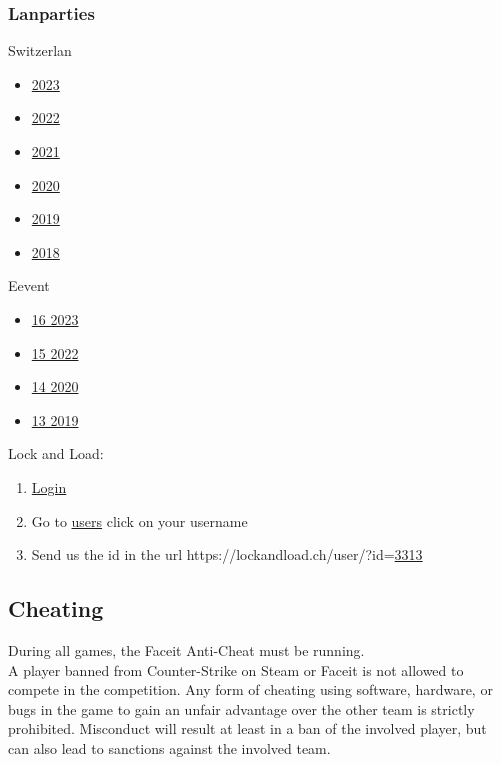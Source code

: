\documentclass{article}
\begin{document}
\subsubsection{Lanparties}
Switzerlan
\begin{itemize}
    \item \href{https://battlefy.com/switzerlan-2023/switzerlan-2023-counter-strike-2/65293e1a490b280d6f6adcb0/participants}{2023}
    \item \href{https://battlefy.com/switzerlan-2022/switzerlan-2022-csgo/634937c11ecc2379690e86f8/participants}{2022}
    \item \href{https://battlefy.com/switzerlan-2021/switzerlan-2021-csgo/613e02153a882b30a4149fc3/participants}{2021}
    \item \href{https://battlefy.com/switzerlan-2020/switzerlan-2020-csgo/5f806e118f28e0606c16e93a/participants}{2020}
    \item \href{https://battlefy.com/switzerlan-2019/csgo-5on5-main-tournament/5dd7f3c10f8e011abc0fd63f/participants}{2019}
    \item \href{https://battlefy.com/switzerlan-2018/csgo-5on5-main-tournament/5bb561bd0983dd03b26db586/participants}{2018}
\end{itemize}
Eevent
\begin{itemize}
    \item \href{https://16.eevent.ch/turnier/?do=teilnehmer&id=268}{16 2023}
    \item \href{https://15.eevent.ch/turnier/?do=teilnehmer&id=244}{15 2022}
    \item \href{https://14.eevent.ch/turnier/?do=teilnehmer&id=188}{14 2020}
    \item \href{https://13.eevent.ch/turnier/?do=teilnehmer&id=149}{13 2019}
\end{itemize}
Lock and Load:
\begin{enumerate}
 \item \href{https://lockandload.ch/user/?do=login}{Login}
 \item Go to \href{https://lockandload.ch/online/}{users} click on your username
 \item Send us the id in the url https://lockandload.ch/user/?id=\underline{3313}
\end{enumerate}

\subsection{Cheating}
During all games, the Faceit Anti-Cheat must be running.\\
A player banned from Counter-Strike on Steam or Faceit is not allowed to compete in the competition.
Any form of cheating using software, hardware, or bugs in the game to gain an unfair advantage over the 
other team is strictly prohibited. Misconduct will result at least in a ban of the involved player, but can also lead to sanctions against the involved team.\\
\end{document}
